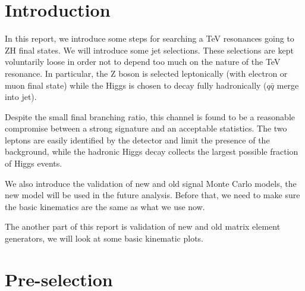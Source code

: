 \documentclass[12pt]{article} %
\begin{document}

\tableofcontents %

\newpage %



\section{Introduction} %

In this report, we introduce some steps for searching a TeV resonances going to ZH final states. We will introduce some jet selections. These selections are kept voluntarily loose in order not to depend too much on the nature of the TeV resonance. In particular, the Z boson is selected leptonically (with electron or muon final state) while the Higgs is chosen to decay fully hadronically ($q\bar{q}$ merge into jet).

Despite the small final branching ratio, this channel is found to be a reasonable compromise between a strong signature and an acceptable statistics. The two leptons are easily identified by the detector and limit the presence of the background, while the hadronic Higgs decay collects the largest possible fraction of Higgs events. 

We also introduce the validation of new and old signal Monte Carlo models, the new model will be used in the future analysis. Before that, we need to make sure the basic kinematics are the same as what we use now. 

The another part of this report is validation of new and old matrix element generators, we will look at some basic kinematic plots.


\newpage



\section{Pre-selection} %
\end{document}

